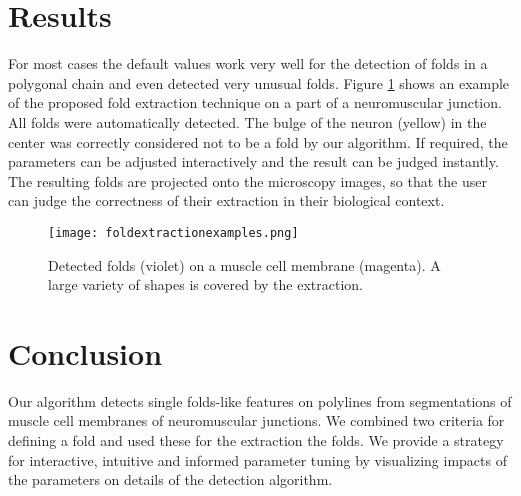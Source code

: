 \documentclass[twocolumn,a4paper]{article}
\begin{document}
\section{Results}
For most cases the default values work very well for the detection of folds in a polygonal chain and even detected very unusual folds.
Figure \ref{fig:foldDetection_combined} shows an example of the proposed fold extraction technique on a part of a neuromuscular junction. All folds were automatically detected. The bulge of the neuron (yellow) in the center was correctly considered not to be a fold by our algorithm.
If required, the parameters can be adjusted interactively and the result can be judged instantly.
The resulting folds are projected onto the microscopy images, so that the user can judge the correctness of their extraction in their biological context.

\begin{figure}[htbp]
    \centering
    \texttt{[image: foldextractionexamples.png]}
    \caption{\label{fig:foldDetection_combined}
        Detected folds (violet) on a muscle cell membrane (magenta). A large variety of shapes is covered by the extraction.}
\end{figure}


\section{Conclusion}
Our algorithm detects single folds-like features on polylines from segmentations of muscle cell membranes of neuromuscular junctions.
We combined two criteria for defining a fold and used these for the extraction the folds.
We provide a strategy for interactive, intuitive and informed parameter tuning by visualizing impacts of the parameters on details of the detection algorithm.





{}

\end{document}
